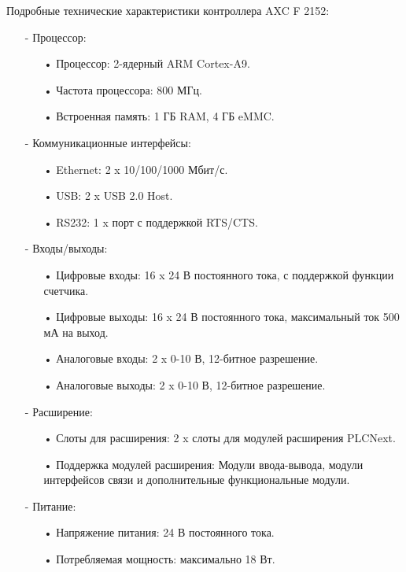 Подробные технические характеристики контроллера AXC F 2152:

\begin{itemize}

    \item[-] Процессор:
        \begin{itemize}
            \item[•] Процессор: 2-ядерный ARM Cortex-A9.
            \item[•] Частота процессора: 800 МГц.
            \item[•] Встроенная память: 1 ГБ RAM, 4 ГБ eMMC.
        \end{itemize}

    \item[-] Коммуникационные интерфейсы:
        \begin{itemize}
            \item[•] Ethernet: 2 x 10/100/1000 Мбит/с.
            \item[•] USB: 2 x USB 2.0 Host.
            \item[•] RS232: 1 x порт с поддержкой RTS/CTS.
        \end{itemize}

    \item[-] Входы/выходы:
        \begin{itemize}
            \item[•] Цифровые входы: 16 x 24 В постоянного тока, с поддержкой функции счетчика.
            \item[•] Цифровые выходы: 16 x 24 В постоянного тока, максимальный ток 500 мА на выход.
            \item[•] Аналоговые входы: 2 x 0-10 В, 12-битное разрешение.
            \item[•] Аналоговые выходы: 2 x 0-10 В, 12-битное разрешение.
        \end{itemize}

    \item[-] Расширение:
        \begin{itemize}
            \item[•] Слоты для расширения: 2 x слоты для модулей расширения PLCNext.
            \item[•] Поддержка модулей расширения: Модули ввода-вывода, модули интерфейсов связи и дополнительные функциональные модули.
        \end{itemize}

    \item[-] Питание:
        \begin{itemize}
            \item[•] Напряжение питания: 24 В постоянного тока.
            \item[•] Потребляемая мощность: максимально 18 Вт.
        \end{itemize}


\end{itemize}
